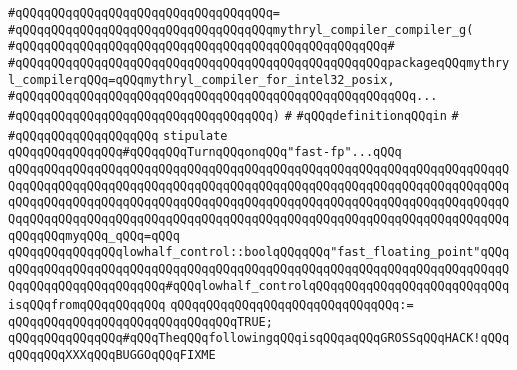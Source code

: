 \verb|#qQQqqQQqqQQqqQQqqQQqqQQqqQQqqQQqqQQq=|\newline
\verb|#qQQqqQQqqQQqqQQqqQQqqQQqqQQqqQQqqQQqmythryl_compiler_compiler_g(|\newline
\verb|#qQQqqQQqqQQqqQQqqQQqqQQqqQQqqQQqqQQqqQQqqQQqqQQqqQQq#|\newline
\verb|#qQQqqQQqqQQqqQQqqQQqqQQqqQQqqQQqqQQqqQQqqQQqqQQqqQQqpackageqQQqmythryl_compilerqQQq=qQQqmythryl_compiler_for_intel32_posix,|\newline
\verb|#qQQqqQQqqQQqqQQqqQQqqQQqqQQqqQQqqQQqqQQqqQQqqQQqqQQqqQQq...|\newline
\verb|#qQQqqQQqqQQqqQQqqQQqqQQqqQQqqQQqqQQq)|\newline
\verb|#|\newline
\verb|#qQQqdefinitionqQQqin|\newline
\verb|#|\newline
\verb|#qQQqqQQqqQQqqQQqqQQq|\newline
\newline
\newline
\newline
\verb|stipulate|\newline
\newline
\verb|qQQqqQQqqQQqqQQq#qQQqqQQqTurnqQQqonqQQq"fast-fp"...qQQq|\newline
\verb|qQQqqQQqqQQqqQQqqQQqqQQqqQQqqQQqqQQqqQQqqQQqqQQqqQQqqQQqqQQqqQQqqQQqqQQqqQQqqQQqqQQqqQQqqQQqqQQqqQQqqQQqqQQqqQQqqQQqqQQqqQQqqQQqqQQqqQQqqQQqqQQqqQQqqQQqqQQqqQQqqQQqqQQqqQQqqQQqqQQqqQQqqQQqqQQqqQQqqQQqqQQqqQQqqQQqqQQqqQQqqQQqqQQqqQQqqQQqqQQqqQQqqQQqqQQqqQQqqQQqqQQqqQQqqQQqqQQqqQQqqQQqqQQqmyqQQq_qQQq=qQQq|\newline
\verb|qQQqqQQqqQQqqQQqlowhalf_control::boolqQQqqQQq"fast_floating_point"qQQqqQQqqQQqqQQqqQQqqQQqqQQqqQQqqQQqqQQqqQQqqQQqqQQqqQQqqQQqqQQqqQQqqQQqqQQqqQQqqQQqqQQqqQQqqQQq#qQQqlowhalf_controlqQQqqQQqqQQqqQQqqQQqqQQqqQQqisqQQqfromqQQqqQQqqQQq|\newline
\verb|qQQqqQQqqQQqqQQqqQQqqQQqqQQqqQQq:=|\newline
\verb|qQQqqQQqqQQqqQQqqQQqqQQqqQQqqQQqTRUE;|\newline
\newline
\verb|qQQqqQQqqQQqqQQq#qQQqTheqQQqfollowingqQQqisqQQqaqQQqGROSSqQQqHACK!qQQqqQQqqQQqXXXqQQqBUGGOqQQqFIXME|\newline
